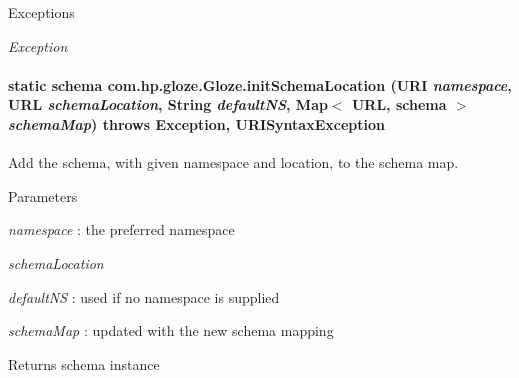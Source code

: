\begin{DoxyExceptions}{Exceptions}
\item[{\em Exception}]\end{DoxyExceptions}
\hypertarget{classcom_1_1hp_1_1gloze_1_1_gloze_ae82f468c04ca83a5f72c6b7570ed804e}{
\paragraph[{initSchemaLocation}]{\setlength{\rightskip}{0pt plus 5cm}static schema com.hp.gloze.Gloze.initSchemaLocation (URI {\em namespace}, \/  URL {\em schemaLocation}, \/  String {\em defaultNS}, \/  Map$<$ URL, schema $>$ {\em schemaMap})  throws Exception, URISyntaxException }\hfill}
\label{classcom_1_1hp_1_1gloze_1_1_gloze_ae82f468c04ca83a5f72c6b7570ed804e}
Add the schema, with given namespace and location, to the schema map. 
\begin{DoxyParams}{Parameters}
\item[{\em namespace}]: the preferred namespace \item[{\em schemaLocation}]\item[{\em defaultNS}]: used if no namespace is supplied \item[{\em schemaMap}]: updated with the new schema mapping \end{DoxyParams}
\begin{DoxyReturn}{Returns}
schema instance 
\end{DoxyReturn}

